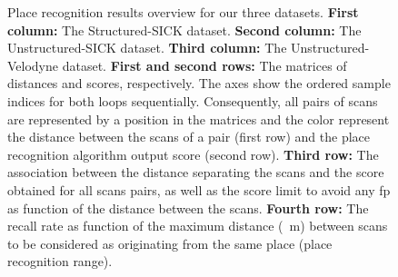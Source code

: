 \begin{figure}[H]
    \caption[Place recognition results overview for our three datasets.]{Place recognition results overview for our three datasets. \textbf{First column:} The Structured-SICK dataset. \textbf{Second column:} The Unstructured-SICK dataset. \textbf{Third column:} The Unstructured-Velodyne dataset. \textbf{First and second rows:} The matrices of distances and scores, respectively. The axes show the ordered sample indices for both loops sequentially. Consequently, all pairs of scans are represented by a position in the matrices and the color represent the distance between the scans of a pair (first row) and the place recognition algorithm output score (second row). \textbf{Third row:} The association between the distance separating the scans and the score obtained for all scans pairs, as well as the score limit to avoid any \gls*{fp} as function of the distance between the scans. \textbf{Fourth row:} The recall rate as function of the maximum distance (\SI{}{\meter}) between scans to be considered as originating from the same place (place recognition range).} 
    \label{fig:chap_slam_results}
\end{figure}
